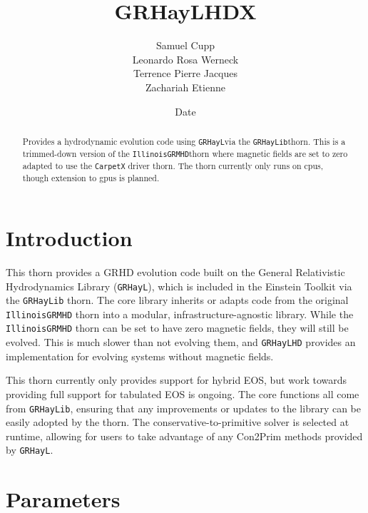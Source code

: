 \documentclass{article}
\begin{document}
\title{GRHayLHDX}
\author{Samuel Cupp \\ Leonardo Rosa Werneck \\ Terrence Pierre Jacques \\ Zachariah Etienne}
\date{$ $Date$ $}

\maketitle


\newcommand{\grhayl}{\texttt{GRHayL}}
\newcommand{\glib}{\texttt{GRHayLib}}
\newcommand{\ghd}{\texttt{GRHayLHD}}
\newcommand{\ghdx}{\texttt{GRHayLHDX}}
\newcommand{\igm}{\texttt{IllinoisGRMHD}}
\newcommand{\hydrobase}{\texttt{HydroBase}}

\begin{abstract}
Provides a hydrodynamic evolution code using \grhayl via the
\glib thorn. This is a trimmed-down version of the \igm thorn
where magnetic fields are set to zero adapted to use the
\texttt{CarpetX} driver thorn. The thorn currently only
runs on cpus, though extension to gpus is planned.
\end{abstract}

\section{Introduction}

This thorn provides a GRHD evolution code built on
the General Relativistic Hydrodynamics Library (\grhayl),
which is included in the Einstein Toolkit via the \glib{}
thorn. The core library inherits or adapts code from the
original \igm{} thorn into a modular, infrastructure-agnostic
library. While the \igm{} thorn can be set to have
zero magnetic fields, they will still be evolved. This
is much slower than not evolving them, and \ghd{} provides an
implementation for evolving systems without magnetic
fields.

This thorn currently only provides support for hybrid EOS, but
work towards providing full support for tabulated EOS is ongoing.
The core functions all come from \glib,
ensuring that any improvements or updates to the library can
be easily adopted by the thorn. The conservative-to-primitive
solver is selected at runtime, allowing for users to take
advantage of any Con2Prim methods provided by \grhayl.

\section{Parameters}
\end{document}
